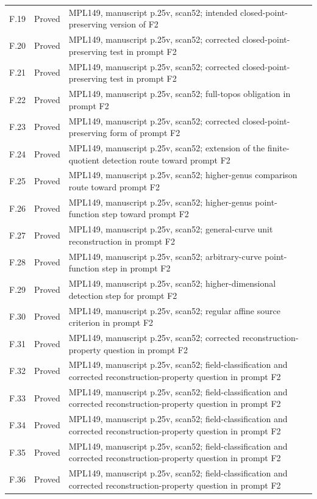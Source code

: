 {\begin{longtable}{p{1.9cm}p{1.7cm}p{10.3cm}}
F.19 & Proved & MPL149, manuscript p.25v, scan52; intended closed-point-preserving version of F2 \\
F.20 & Proved & MPL149, manuscript p.25v, scan52; corrected closed-point-preserving test in prompt F2 \\
F.21 & Proved & MPL149, manuscript p.25v, scan52; corrected closed-point-preserving test in prompt F2 \\
F.22 & Proved & MPL149, manuscript p.25v, scan52; full-topos obligation in prompt F2 \\
F.23 & Proved & MPL149, manuscript p.25v, scan52; corrected closed-point-preserving form of prompt F2 \\
F.24 & Proved & MPL149, manuscript p.25v, scan52; extension of the finite-quotient detection route toward prompt F2 \\
F.25 & Proved & MPL149, manuscript p.25v, scan52; higher-genus comparison route toward prompt F2 \\
F.26 & Proved & MPL149, manuscript p.25v, scan52; higher-genus point-function step toward prompt F2 \\
F.27 & Proved & MPL149, manuscript p.25v, scan52; general-curve unit reconstruction in prompt F2 \\
F.28 & Proved & MPL149, manuscript p.25v, scan52; arbitrary-curve point-function step in prompt F2 \\
F.29 & Proved & MPL149, manuscript p.25v, scan52; higher-dimensional detection step for prompt F2 \\
F.30 & Proved & MPL149, manuscript p.25v, scan52; regular affine source criterion in prompt F2 \\
F.31 & Proved & MPL149, manuscript p.25v, scan52; corrected reconstruction-property question in prompt F2 \\
F.32 & Proved & MPL149, manuscript p.25v, scan52; field-classification and corrected reconstruction-property question in prompt F2 \\
F.33 & Proved & MPL149, manuscript p.25v, scan52; field-classification and corrected reconstruction-property question in prompt F2 \\
F.34 & Proved & MPL149, manuscript p.25v, scan52; field-classification and corrected reconstruction-property question in prompt F2 \\
F.35 & Proved & MPL149, manuscript p.25v, scan52; field-classification and corrected reconstruction-property question in prompt F2 \\
F.36 & Proved & MPL149, manuscript p.25v, scan52; field-classification and corrected reconstruction-property question in prompt F2 \\

\end{longtable}}
